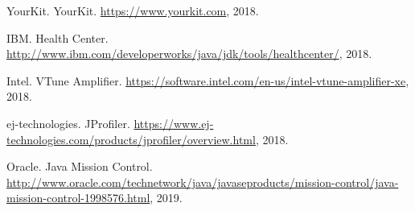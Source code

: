 \documentclass[]{usiinfthesis}
\begin{document}
\begin{thebibliography}{9}
YourKit. YourKit. \url{https://www.yourkit.com}, 2018.

IBM. Health Center. \url{http://www.ibm.com/developerworks/java/jdk/tools/healthcenter/}, 2018.

Intel. VTune Amplifier. \url{https://software.intel.com/en-us/intel-vtune-amplifier-xe}, 2018.

ej-technologies. JProfiler. \url{https://www.ej-technologies.com/products/jprofiler/overview.html}, 2018.

Oracle. Java Mission Control. \url{http://www.oracle.com/technetwork/java/javaseproducts/mission-control/java-mission-control-1998576.html}, 2019.



\end{thebibliography}
\end{document}
